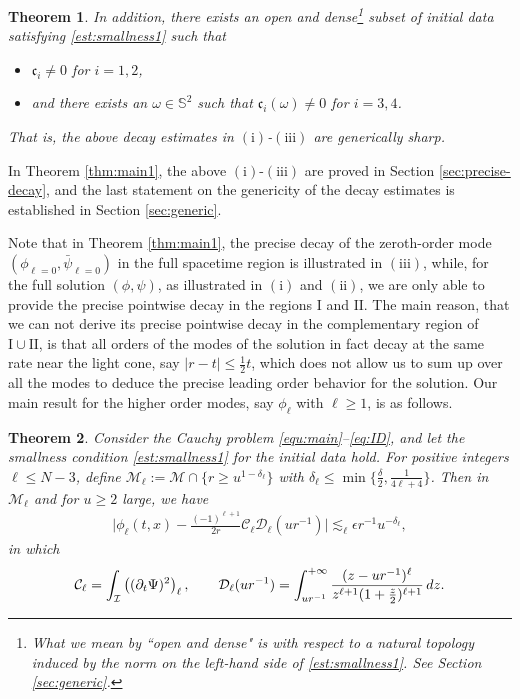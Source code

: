 \documentclass[a4paper,reqno]{amsart}
\newtheorem{theorem}{Theorem}[section]
\theoremstyle{definition}
\numberwithin{equation}{section}
\def\cfrak{\mathfrak{c}}
\def\MM{\mathcal{M}}
\def\ep{\epsilon}
\begin{document}
\begin{theorem}
In addition, there exists an open and dense\footnote{What we mean by ``open and dense" is with respect to a natural topology induced by the norm on the left-hand side of \eqref{est:smallness1}. See Section \ref{sec:generic}.} subset of initial data satisfying \eqref{est:smallness1} such that
\begin{itemize}
    \item $\cfrak_i\neq 0$ for $i=1,2$,
    \item and there exists an $\omega\in\mathbb{S}^2$ such that $\cfrak_i(\omega)\neq 0$ for $i=3,4$.
\end{itemize} 
That is, the above decay estimates in {$\mathrm{(i)}$-$\mathrm{(iii)}$} are generically sharp.
 \end{theorem}


In Theorem \ref{thm:main1}, the above {$\mathrm{(i)}$-$\mathrm{(iii)}$} are proved in Section \ref{sec:precise-decay}, and the last statement on the genericity of the decay estimates is established in Section \ref{sec:generic}.



Note that in Theorem \ref{thm:main1}, the precise decay of the zeroth-order mode $(\phi_{\ell=0}, \bar{\psi}_{\ell=0})$ in the full spacetime \textrm{region} $\mathrm{i}$s illustrated in {$\mathrm{(iii)}$}, while, for the full solution $(\phi, \psi)$,
as illustrated in $\mathrm{(i)}$ and $\mathrm{(ii)}$, we are only able to provide the precise pointwise decay in the regions $\mathrm{I}$ and $\mathrm{II}$. The main reason, that we can not derive its precise pointwise decay in the complementary region of $\mathrm{I}\cup\mathrm{II}$, is that all orders of the modes of the solution in fact decay at the same rate near the light cone, say $|r-t|\leq \frac{1}{2} t$, which does not allow us to sum up over all the modes to deduce the precise leading order behavior for the solution. 
Our main result for the higher order modes, say $\phi_{\ell}$ with $\ell\geq 1$, is as follows.

\begin{theorem}\label{thm:higher}
Consider the Cauchy problem \eqref{equ:main}--\eqref{eq:ID}, and let the smallness condition \eqref{est:smallness1} for the initial data hold. For positive integers $\ell\leq N-3$, define $\mathcal{M}_{\ell} :=\MM\cap\{ r\geq u^{1-\delta_\ell} \}$ with $\delta_\ell \leq \min\{ \frac{\delta}{2},\frac{1}{4\ell + 4}\}$. Then in $\mathcal{M}_{\ell}$ and for $u\geq 2$ large, we have
\begin{align}
    \bigg|\phi_\ell(t, x) - \frac{(-1)^{\ell+1}}{2r} \mathcal{C}_\ell \mathcal{D}_\ell(ur^{-1}) \bigg|
    \lesssim_\ell
    \ep r^{-1} u^{-\delta_{\ell}},
\end{align}
in which
\begin{align*}
    \mathcal{C}_\ell
    =
    \int_{\mathcal{I}} \left((\partial_t \Psi)^2\right)_\ell,
    \qquad
    \mathcal{D}_\ell(ur^{-1})
    =\int_{ur^{-1}}^{+\infty} {(z-ur^{-1})^{\ell} \over z^{\ell+1} (1+ {z\over 2})^{\ell+1}} \, dz.
\end{align*}
\end{theorem}
 
\end{document}
